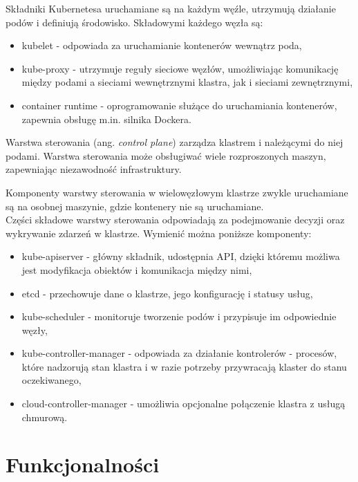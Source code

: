 Składniki Kubernetesa uruchamiane są na każdym węźle, utrzymują działanie podów i definiują środowisko. Składowymi każdego węzła są:
\begin{itemize}
    \item kubelet - odpowiada za uruchamianie kontenerów wewnątrz poda,
    \item kube-proxy - utrzymuje reguły sieciowe węzłów, umożliwiając komunikację między podami a sieciami wewnętrznymi klastra, jak i sieciami zewnętrznymi,
    \item container runtime - oprogramowanie służące do uruchamiania kontenerów, zapewnia obsługę m.in. silnika Dockera.
\end{itemize}

Warstwa sterowania (ang. \textit{control plane}) zarządza klastrem i należącymi do niej podami. Warstwa sterowania może obsługiwać wiele rozproszonych maszyn, zapewniając niezawodność infrastruktury. 

Komponenty warstwy sterowania w wielowęzłowym klastrze zwykle uruchamiane są na osobnej maszynie, gdzie kontenery nie są uruchamiane.\\

Części składowe warstwy sterowania odpowiadają za podejmowanie decyzji oraz wykrywanie zdarzeń w klastrze. Wymienić można poniższe komponenty:

\begin{itemize}
    \item kube-apiserver - główny składnik, udostępnia API, dzięki któremu możliwa jest modyfikacja obiektów i komunikacja między nimi,
    \item etcd - przechowuje dane o klastrze, jego konfigurację i statusy usług,
    \item kube-scheduler - monitoruje tworzenie podów i przypisuje im odpowiednie węzły,
    \item kube-controller-manager - odpowiada za działanie kontrolerów - procesów, które nadzorują stan klastra i w razie potrzeby przywracają klaster do stanu oczekiwanego,
    \item cloud-controller-manager - umożliwia opcjonalne połączenie klastra z usługą chmurową.
\end{itemize}


\section{Funkcjonalności}

